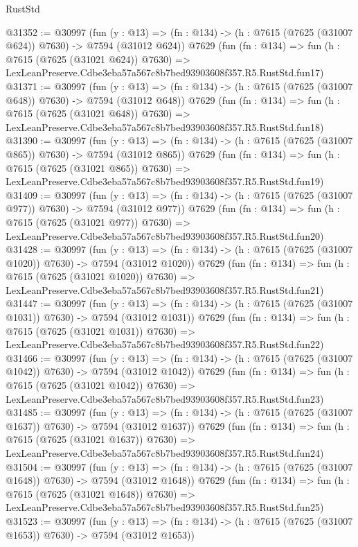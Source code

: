 \begin{lexlean}{RustStd}
\begin{coremodule}
@31352 := @30997
    (fun (y : @13) => (fn : @134) -> (h : @7615 (@7625 (@31007 @624)) @7630) -> @7594 (@31012 @624))
    @7629
    (fun (fn : @134) =>
    fun (h : @7615 (@7625 (@31021 @624)) @7630) =>
    LexLeanPreserve.Cdbe3eba57a567c8b7bed93903608f357.R5.RustStd.fun17)
@31371 := @30997
    (fun (y : @13) => (fn : @134) -> (h : @7615 (@7625 (@31007 @648)) @7630) -> @7594 (@31012 @648))
    @7629
    (fun (fn : @134) =>
    fun (h : @7615 (@7625 (@31021 @648)) @7630) =>
    LexLeanPreserve.Cdbe3eba57a567c8b7bed93903608f357.R5.RustStd.fun18)
@31390 := @30997
    (fun (y : @13) => (fn : @134) -> (h : @7615 (@7625 (@31007 @865)) @7630) -> @7594 (@31012 @865))
    @7629
    (fun (fn : @134) =>
    fun (h : @7615 (@7625 (@31021 @865)) @7630) =>
    LexLeanPreserve.Cdbe3eba57a567c8b7bed93903608f357.R5.RustStd.fun19)
@31409 := @30997
    (fun (y : @13) => (fn : @134) -> (h : @7615 (@7625 (@31007 @977)) @7630) -> @7594 (@31012 @977))
    @7629
    (fun (fn : @134) =>
    fun (h : @7615 (@7625 (@31021 @977)) @7630) =>
    LexLeanPreserve.Cdbe3eba57a567c8b7bed93903608f357.R5.RustStd.fun20)
@31428 := @30997
    (fun (y : @13) =>
    (fn : @134) -> (h : @7615 (@7625 (@31007 @1020)) @7630) -> @7594 (@31012 @1020))
    @7629
    (fun (fn : @134) =>
    fun (h : @7615 (@7625 (@31021 @1020)) @7630) =>
    LexLeanPreserve.Cdbe3eba57a567c8b7bed93903608f357.R5.RustStd.fun21)
@31447 := @30997
    (fun (y : @13) =>
    (fn : @134) -> (h : @7615 (@7625 (@31007 @1031)) @7630) -> @7594 (@31012 @1031))
    @7629
    (fun (fn : @134) =>
    fun (h : @7615 (@7625 (@31021 @1031)) @7630) =>
    LexLeanPreserve.Cdbe3eba57a567c8b7bed93903608f357.R5.RustStd.fun22)
@31466 := @30997
    (fun (y : @13) =>
    (fn : @134) -> (h : @7615 (@7625 (@31007 @1042)) @7630) -> @7594 (@31012 @1042))
    @7629
    (fun (fn : @134) =>
    fun (h : @7615 (@7625 (@31021 @1042)) @7630) =>
    LexLeanPreserve.Cdbe3eba57a567c8b7bed93903608f357.R5.RustStd.fun23)
@31485 := @30997
    (fun (y : @13) =>
    (fn : @134) -> (h : @7615 (@7625 (@31007 @1637)) @7630) -> @7594 (@31012 @1637))
    @7629
    (fun (fn : @134) =>
    fun (h : @7615 (@7625 (@31021 @1637)) @7630) =>
    LexLeanPreserve.Cdbe3eba57a567c8b7bed93903608f357.R5.RustStd.fun24)
@31504 := @30997
    (fun (y : @13) =>
    (fn : @134) -> (h : @7615 (@7625 (@31007 @1648)) @7630) -> @7594 (@31012 @1648))
    @7629
    (fun (fn : @134) =>
    fun (h : @7615 (@7625 (@31021 @1648)) @7630) =>
    LexLeanPreserve.Cdbe3eba57a567c8b7bed93903608f357.R5.RustStd.fun25)
@31523 := @30997
    (fun (y : @13) =>
    (fn : @134) -> (h : @7615 (@7625 (@31007 @1653)) @7630) -> @7594 (@31012 @1653))

\end{coremodule}
\end{lexlean}

